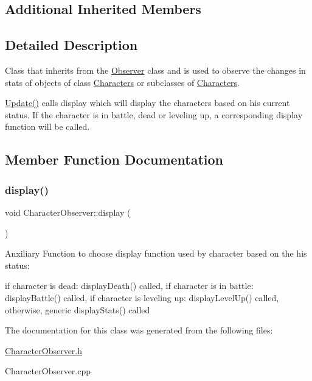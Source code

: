 \subsection*{Additional Inherited Members}


\subsection{Detailed Description}
Class that inherits from the \hyperlink{class_observer}{Observer} class and is used to observe the changes in stats of objects of class \hyperlink{class_characters}{Characters} or subclasses of \hyperlink{class_characters}{Characters}.

\hyperlink{class_character_observer_a398d6d784065c7ed36c928d44a574630}{Update()} calls display which will display the character\textquotesingle{}s based on his current status. If the character is in battle, dead or leveling up, a corresponding display function will be called. 

\subsection{Member Function Documentation}
\hypertarget{class_character_observer_af255a3fd431b55de8dd2ab9a639e546b}{}\label{class_character_observer_af255a3fd431b55de8dd2ab9a639e546b} 
\subsubsection{\texorpdfstring{display()}{display()}}
{\footnotesize\ttfamily void Character\+Observer\+::display (\begin{DoxyParamCaption}{ }\end{DoxyParamCaption})}

Anxiliary Function to choose display function used by character based on the his status\+:

if character is dead\+: display\+Death() called, if character is in battle\+: display\+Battle() called, if character is leveling up\+: display\+Level\+Up() called, otherwise, generic display\+Stats() called 

The documentation for this class was generated from the following files\+:\begin{DoxyCompactItemize}
\item 
\hyperlink{_character_observer_8h}{Character\+Observer.\+h}\item 
Character\+Observer.\+cpp\end{DoxyCompactItemize}
